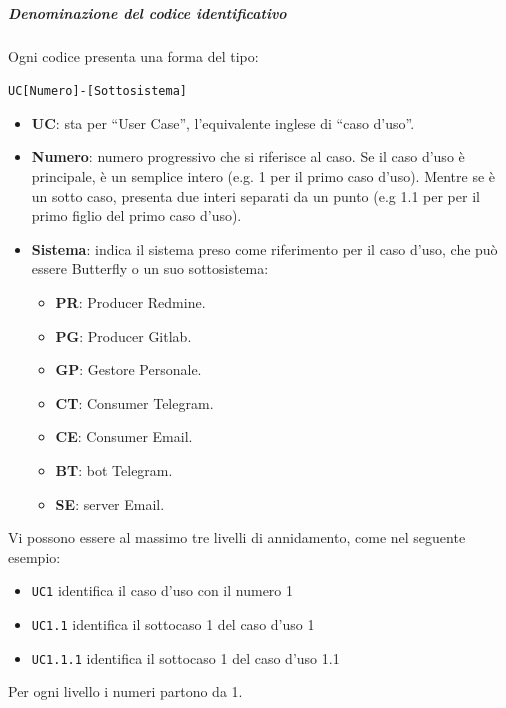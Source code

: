		\subparagraph{Denominazione del codice identificativo}
		Ogni codice presenta una forma del tipo:
		\begin{center}
			\texttt{UC[Numero]-[Sottosistema]}
		\end{center}

		\begin{itemize}
			\item \textbf{UC}: sta per ``User Case'', l'equivalente inglese di ``caso d'uso''.
			\item \textbf{Numero}: numero progressivo che si riferisce al caso. Se il caso d'uso è principale, è un semplice intero (e.g. 1 per il primo caso d'uso). Mentre se è un sotto caso, presenta due interi separati da un punto (e.g 1.1 per per il primo figlio del primo caso d'uso).
			\item \textbf{Sistema}: indica il sistema preso come riferimento per il caso d'uso, che può essere Butterfly o un suo sottosistema:
			\begin{itemize}
				\item \textbf{PR}: Producer Redmine.
				\item \textbf{PG}: Producer Gitlab.
				\item \textbf{GP}: Gestore Personale.
				\item \textbf{CT}: Consumer Telegram.
				\item \textbf{CE}: Consumer Email.
				\item \textbf{BT}: bot Telegram.
				\item \textbf{SE}: server Email.
			\end{itemize}
		\end{itemize}

		Vi possono essere al massimo tre livelli di annidamento, come nel seguente esempio:
		\begin{itemize}
			\item \texttt{UC1} identifica il caso d'uso con il numero 1
			\item \texttt{UC1.1} identifica il sottocaso 1 del caso d'uso 1
			\item \texttt{UC1.1.1} identifica il sottocaso 1 del caso d'uso 1.1
		\end{itemize}
		Per ogni livello i numeri partono da 1.

